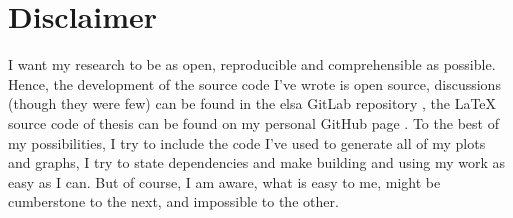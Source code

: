 \section{Disclaimer}\label{sec:disclaimer}

I want my research to be as open, reproducible and comprehensible as possible. Hence, the
development of the source code I've wrote is open source, discussions (though they were few) can be
found in the elsa GitLab repository , the \LaTeX{} source code of thesis
can be found on my personal GitHub page . To the best of my
possibilities, I try to include the code I've used to generate all of my plots and graphs, I try to
state dependencies and make building and using my work as easy as I can. But of course, I am aware,
what is easy to me, might be cumberstone to the next, and impossible to the other.

